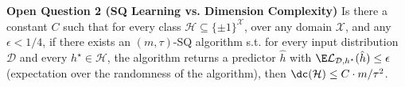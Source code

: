 \small
\textbf{Open Question 2 (SQ Learning vs. Dimension Complexity)}
Is there a constant $C$ such that for every class $\mathcal H\subseteq\{\pm1\}^{\mathcal X}$, over any domain $\mathcal X$, and any $\epsilon<1/4$, if there exists an $(m,\tau)$-SQ algorithm s.t. for every input distribution $\mathcal D$ and every $h^\star\in\mathcal H$, the algorithm returns a predictor $\hat h$ with $\E\mathcal L_{\mathcal D,h^\star}(\hat h)\le\epsilon$ (expectation over the randomness of the algorithm), then $\dc(\mathcal H)\le C\cdot m/\tau^2$.

